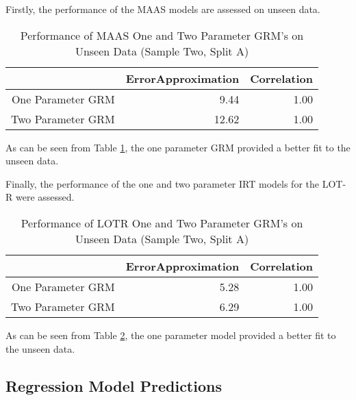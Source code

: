 \documentclass{article}
\begin{document}
Firstly, the performance of the MAAS models are assessed on unseen data. 

\begin{table}[ht]
\centering
\begin{tabular}{rrr}
  \hline
 & ErrorApproximation & Correlation \\ 
  \hline
One Parameter GRM & 9.44 & 1.00 \\ 
  Two Parameter GRM & 12.62 & 1.00 \\ 
   \hline
\end{tabular}
\caption{Performance of MAAS One and Two Parameter GRM's on Unseen Data (Sample Two, Split A)} 
\label{tab:hom1maasgrmtest}
\end{table}
As can be seen from Table \ref{tab:hom1maasgrmtest}, the one parameter GRM provided a better fit to the unseen  data. 

Finally, the performance of the one and two parameter IRT models for the LOT-R were assessed. 

\begin{table}[ht]
\centering
\begin{tabular}{rrr}
  \hline
 & ErrorApproximation & Correlation \\ 
  \hline
One Parameter GRM & 5.28 & 1.00 \\ 
  Two Parameter GRM & 6.29 & 1.00 \\ 
   \hline
\end{tabular}
\caption{Performance of LOTR One and Two Parameter GRM's on Unseen Data (Sample Two, Split A)} 
\label{tab:hom1lotrgrmtest}
\end{table}

As can be seen from Table \ref{tab:hom1lotrgrmtest}, the one parameter model provided a better fit to the unseen data. 

\subsection{Regression Model Predictions}
\label{sec:regr-model-pred}
\end{document}

